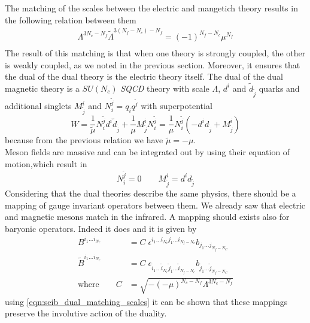 The matching of the scales between the electric and mangetich theory results in the following relation between them \cite{Seiberg:1994pq}
\begin{align}
 \Lambda^{3 N_c - N_f} \tilde{\Lambda}^{3 (N_f - N_c) - N_f} = (-1)^{N_f - N_c} \mu^{N_f} \\
%
 \label{eqn:seib_dual_matching_scales}
\end{align}
The result of this matching is that when one theory is strongly coupled, the other is weakly coupled, as we noted in the previous section.
Moreover, it ensures that the dual of the dual theory is the electric theory itself.
The dual of the dual magnetic theory is a $SU(N_c) $ \emph{SQCD} theory with scale $\Lambda$, $d^i$ and $\tilde{d}_{\tilde{j}}$ quarks and additional singlets $M^i_{\tilde{j}}$ and $N^{\tilde{j}}_i= q_i q^{\tilde{j}} $ with superpotential
\begin{equation}
 W = \frac{1}{\tilde{\mu}} N^{\tilde{j}}_i d^i \tilde{d}_{\tilde{j}} + \frac{1}{\mu} M^i_{\tilde{j}} N^{\tilde{j}}_i = \frac{1}{\mu} N^{\tilde{j}}_i \left(  - d^i d_{\tilde{j}}  + M^i_{\tilde{j}}  \right) 
\end{equation}
because from the previous relation we have $\tilde{\mu} = - \mu$.\\
Meson fields are massive and can be integrated out by using their equation of motion,which result in
\begin{equation}
 N^{\tilde{j}}_i  = 0 \qquad  M^i_{\tilde{j}} = d^i d_{\tilde{j}}
\end{equation}
Considering that the dual theories describe the same physics, there should be a mapping of gauge invariant operators between them.
We already saw that electric and magnetic mesons match in the infrared. 
A mapping should exists also for baryonic operators. Indeed it does and it is given by
\begin{equation}
\begin{aligned}
 B^{i_1 \dots i_{N_c}} & = C \; \epsilon^{i_1 \dots i_{N_c} j_1 \dots i_{N_f - N_c}} b_{j_1 \dots j_{N_f - N_C}}\\
 \tilde{B}^{i_1 \dots i_{N_c}} &= C \; \epsilon_{\tilde{i}_1 \dots \tilde{i}_{N_c} \tilde{j}_1 \dots \tilde{i}_{N_f - N_c}} b_{ \tilde{j}_1 \dots \tilde{j}_{N_f - N_C}}\\
 \text{where} \qquad C & = \sqrt{ - (-\mu)^{N_c - N_f} \Lambda^{3 N_c - N_f}}
\end{aligned}
\end{equation}
using \eqref{eqn:seib_dual_matching_scales} it can be shown that these mappings preserve the involutive action of the duality. 

